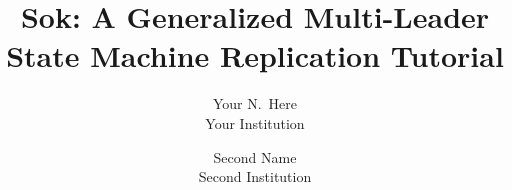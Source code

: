 \documentclass[letterpaper,twocolumn,10pt]{article}
\begin{document}
\date{}

\title{Sok: A Generalized Multi-Leader State Machine Replication Tutorial}

\author{{\rm Your N.\ Here}\\
  Your Institution
  \and
  {\rm Second Name}\\
  Second Institution
} %


\maketitle

\thispagestyle{empty}

{}
{}
{}
{}
{}
{}
{}
{}
{}
{}
{}



\end{document}
